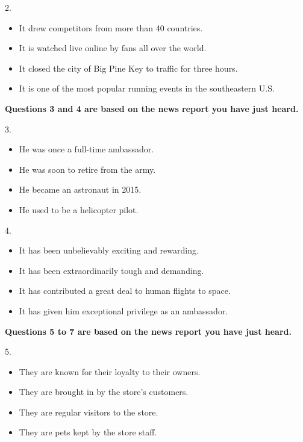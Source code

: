 \documentclass[UTF8,11pt]{ctexart}
\begin{document}
2.


\begin{itemize}[leftmargin=2em,itemsep=.2em,topsep=.4em]\item[A.] It drew competitors from more than 40 countries.
\item[B.] It is watched live online by fans all over the world.
\item[C.] It closed the city of Big Pine Key to traffic for three hours.
\item[D.] It is one of the most popular running events in the southeastern U.S.
\end{itemize}

\textbf{Questions 3 and 4 are based on the news report you have just heard.}


3.


\begin{itemize}[leftmargin=2em,itemsep=.2em,topsep=.4em]\item[A.] He was once a full-time ambassador.
\item[B.] He was soon to retire from the army.
\item[C.] He became an astronaut in 2015.
\item[D.] He used to be a helicopter pilot.
\end{itemize}

4.


\begin{itemize}[leftmargin=2em,itemsep=.2em,topsep=.4em]\item[A.] It has been unbelievably exciting and rewarding.
\item[B.] It has been extraordinarily tough and demanding.
\item[C.] It has contributed a great deal to human flights to space.
\item[D.] It has given him exceptional privilege as an ambassador.
\end{itemize}

\textbf{Questions 5 to 7 are based on the news report you have just heard.}


5.


\begin{itemize}[leftmargin=2em,itemsep=.2em,topsep=.4em]\item[A.] They are known for their loyalty to their owners.
\item[B.] They are brought in by the store’s customers.
\item[C.] They are regular visitors to the store.
\item[D.] They are pets kept by the store staff.
\end{itemize}
\end{document}
